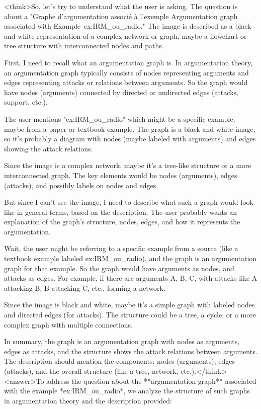 <think>So, let's try to understand what the user is asking. The question is about a "Graphe d'argumentation associé à l'exemple Argumentation graph associated with Example~ex:IRM_ou_radio." The image is described as a black and white representation of a complex network or graph, maybe a flowchart or tree structure with interconnected nodes and paths. 

First, I need to recall what an argumentation graph is. In argumentation theory, an argumentation graph typically consists of nodes representing arguments and edges representing attacks or relations between arguments. So the graph would have nodes (arguments) connected by directed or undirected edges (attacks, support, etc.). 

The user mentions "ex:IRM_ou_radio" which might be a specific example, maybe from a paper or textbook example. The graph is a black and white image, so it's probably a diagram with nodes (maybe labeled with arguments) and edges showing the attack relations. 

Since the image is a complex network, maybe it's a tree-like structure or a more interconnected graph. The key elements would be nodes (arguments), edges (attacks), and possibly labels on nodes and edges. 

But since I can't see the image, I need to describe what such a graph would look like in general terms, based on the description. The user probably wants an explanation of the graph's structure, nodes, edges, and how it represents the argumentation. 

Wait, the user might be referring to a specific example from a source (like a textbook example labeled ex:IRM_ou_radio), and the graph is an argumentation graph for that example. So the graph would have arguments as nodes, and attacks as edges. For example, if there are arguments A, B, C, with attacks like A attacking B, B attacking C, etc., forming a network. 

Since the image is black and white, maybe it's a simple graph with labeled nodes and directed edges (for attacks). The structure could be a tree, a cycle, or a more complex graph with multiple connections. 

In summary, the graph is an argumentation graph with nodes as arguments, edges as attacks, and the structure shows the attack relations between arguments. The description should mention the components: nodes (arguments), edges (attacks), and the overall structure (like a tree, network, etc.).</think><answer>To address the question about the **argumentation graph** associated with the example *ex:IRM_ou_radio*, we analyze the structure of such graphs in argumentation theory and the description provided:  


